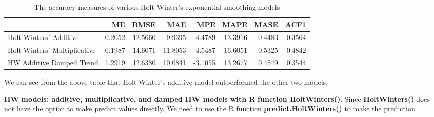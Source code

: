 \documentclass[
]{book}
\begin{document}
\begin{table}

\caption{\label{tab:unnamed-chunk-245}The accuracy measures of various Holt-Winter's 
        exponential smoothing models}
\centering
\begin{tabular}[t]{l|r|r|r|r|r|r|r}
\hline
  & ME & RMSE & MAE & MPE & MAPE & MASE & ACF1\\
\hline
Holt Winters' Additive & 0.2052 & 12.5660 & 9.9395 & -4.4789 & 13.3916 & 0.4483 & 0.3564\\
\hline
Holt Winters' Multiplicative & 0.1987 & 14.6071 & 11.8053 & -4.5487 & 16.6051 & 0.5325 & 0.4842\\
\hline
HW Additive Damped Trend & 1.2919 & 12.6380 & 10.0841 & -3.1055 & 13.2677 & 0.4549 & 0.3544\\
\hline
\end{tabular}
\end{table}

We can see from the above table that Holt-Winter's additive model outperformed the other two models.

\textbf{HW models: additive, multiplicative, and damped HW models with R function HoltWinters()}. Since \textbf{HoltWinters()} does not have the option to make predict values directly. We need to use the R function \textbf{predict.HoltWinters()} to make the prediction.
\end{document}
